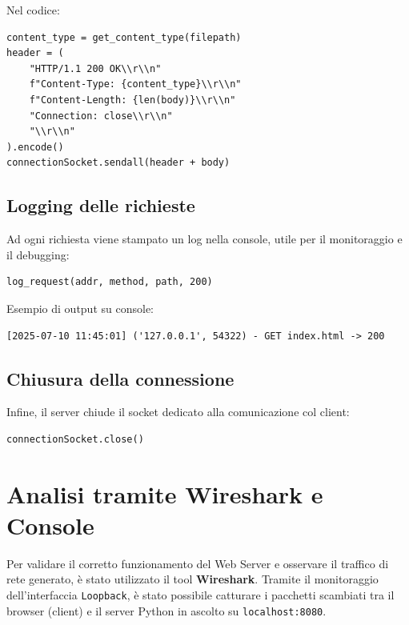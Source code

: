 \documentclass[a4paper,12pt]{report}
\begin{document}
Nel codice:

\begin{verbatim}
content_type = get_content_type(filepath)
header = (
    "HTTP/1.1 200 OK\\r\\n"
    f"Content-Type: {content_type}\\r\\n"
    f"Content-Length: {len(body)}\\r\\n"
    "Connection: close\\r\\n"
    "\\r\\n"
).encode()
connectionSocket.sendall(header + body)
\end{verbatim}



\section{Logging delle richieste}

Ad ogni richiesta viene stampato un log nella console, utile per il monitoraggio e il debugging:

\begin{verbatim}
log_request(addr, method, path, 200)
\end{verbatim}

Esempio di output su console:

\begin{verbatim}
[2025-07-10 11:45:01] ('127.0.0.1', 54322) - GET index.html -> 200
\end{verbatim}



\section{Chiusura della connessione}

Infine, il server chiude il socket dedicato alla comunicazione col client:

\begin{verbatim}
connectionSocket.close()
\end{verbatim}
\chapter{Analisi tramite Wireshark e Console}

Per validare il corretto funzionamento del Web Server e osservare il traffico di rete generato, è stato utilizzato il tool \textbf{Wireshark}. Tramite il monitoraggio dell’interfaccia \texttt{Loopback}, è stato possibile catturare i pacchetti scambiati tra il browser (client) e il server Python in ascolto su \texttt{localhost:8080}.
\end{document}
